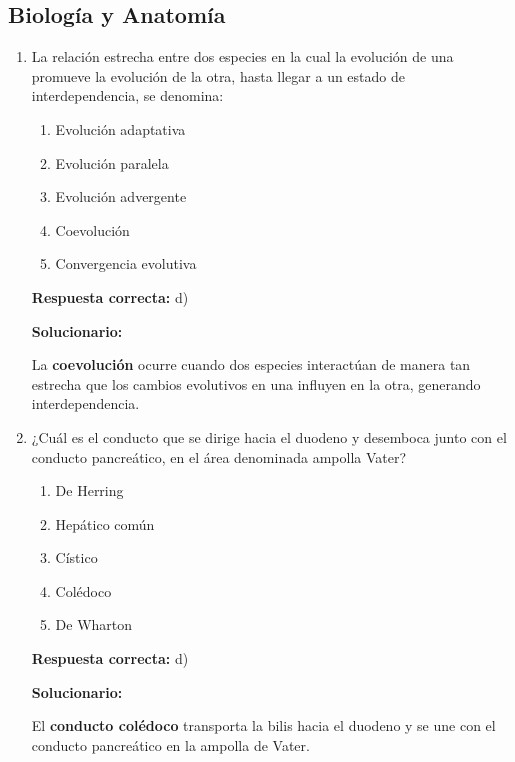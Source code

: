 \subsection*{Biología y Anatomía}

\begin{enumerate}[resume]
	
	\item La relación estrecha entre dos especies en la cual la evolución de una promueve la evolución de la otra, hasta llegar a un estado de interdependencia, se denomina:
	\begin{enumerate}[label=\alph*)]
		\item Evolución adaptativa
		\item Evolución paralela
		\item Evolución advergente
		\item Coevolución
		\item Convergencia evolutiva
	\end{enumerate}
	\textbf{Respuesta correcta:} d)
	
	\vspace{2mm}
	\textbf{Solucionario:}
	
	La \textbf{coevolución} ocurre cuando dos especies interactúan de manera tan estrecha que los cambios evolutivos en una influyen en la otra, generando interdependencia.
	
	\vspace{6mm}
	
	\item ¿Cuál es el conducto que se dirige hacia el duodeno y desemboca junto con el conducto pancreático, en el área denominada ampolla Vater?
	\begin{enumerate}[label=\alph*)]
		\item De Herring
		\item Hepático común
		\item Cístico
		\item Colédoco
		\item De Wharton
	\end{enumerate}
	\textbf{Respuesta correcta:} d)
	
	\vspace{2mm}
	\textbf{Solucionario:}
	
	El \textbf{conducto colédoco} transporta la bilis hacia el duodeno y se une con el conducto pancreático en la ampolla de Vater.
	
	\vspace{6mm}
	
\end{enumerate}

